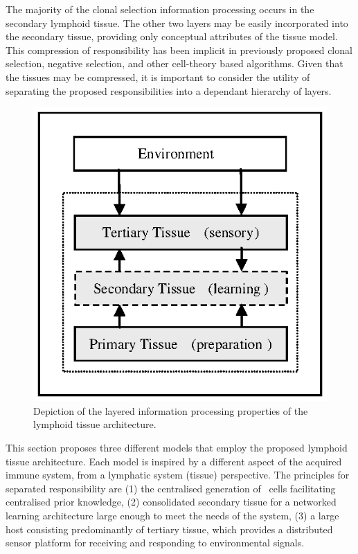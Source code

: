 The majority of the clonal selection information processing occurs in the secondary lymphoid tissue. The other two layers may be easily incorporated into the secondary tissue, providing only conceptual attributes of the tissue model. This compression of responsibility has been implicit in previously proposed clonal selection, negative selection, and other cell-theory based algorithms. Given that the tissues may be compressed, it is important to consider the utility of separating the proposed responsibilities into a dependant hierarchy of layers.

\begin{figure}[ht]
	\centering
	\includegraphics[scale=0.75]{Tissues/tissues-architecture-integration}
	\caption{Depiction of the layered information processing properties of the lymphoid tissue architecture.}
	\label{pic:tissues:architecture:layered}
\end{figure}

This section proposes three different models that employ the proposed lymphoid tissue architecture. Each model is inspired by a different aspect of the acquired immune system, from a lymphatic system (tissue) perspective. The principles for separated responsibility are (1) the centralised generation of \naive\ cells facilitating centralised prior knowledge, (2) consolidated secondary tissue for a networked learning architecture large enough to meet the needs of the system, (3) a large host consisting predominantly of tertiary tissue, which provides a distributed sensor platform for receiving and responding to environmental signals.

